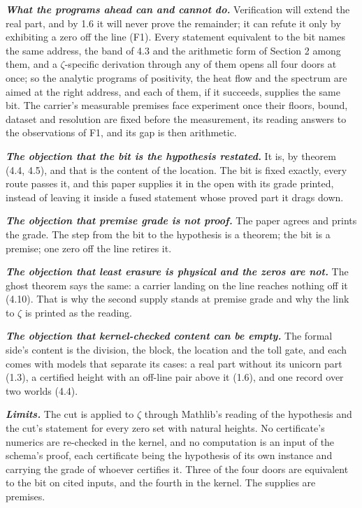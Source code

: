 \documentclass[10pt]{article}
\begin{document}
\textbf{\emph{What the programs ahead can and cannot do.}} Verification
will extend the real part, and by 1.6 it will never prove the remainder;
it can refute it only by exhibiting a zero off the line (F1). Every
statement equivalent to the bit names the same address, the band of 4.3
and the arithmetic form of Section 2 among them, and a
\(\zeta\)-specific derivation through any of them opens all four doors
at once; so the analytic programs of positivity, the heat flow and the
spectrum are aimed at the right address, and each of them, if it
succeeds, supplies the same bit. The carrier's measurable premises face
experiment once their floors, bound, dataset and resolution are fixed
before the measurement, its reading answers to the observations of F1,
and its gap is then arithmetic.

\textbf{\emph{The objection that the bit is the hypothesis restated.}}
It is, by theorem (4.4, 4.5), and that is the content of the location.
The bit is fixed exactly, every route passes it, and this paper supplies
it in the open with its grade printed, instead of leaving it inside a
fused statement whose proved part it drags down.

\textbf{\emph{The objection that premise grade is not proof.}} The paper
agrees and prints the grade. The step from the bit to the hypothesis is
a theorem; the bit is a premise; one zero off the line retires it.

\textbf{\emph{The objection that least erasure is physical and the zeros
are not.}} The ghost theorem says the same: a carrier landing on the
line reaches nothing off it (4.10). That is why the second supply stands
at premise grade and why the link to \(\zeta\) is printed as the
reading.

\textbf{\emph{The objection that kernel-checked content can be empty.}}
The formal side's content is the division, the block, the location and
the toll gate, and each comes with models that separate its cases: a
real part without its unicorn part (1.3), a certified height with an
off-line pair above it (1.6), and one record over two worlds (4.4).

\textbf{\emph{Limits.}} The cut is applied to \(\zeta\) through
Mathlib's reading of the hypothesis and the cut's statement for every
zero set with natural heights. No certificate's numerics are re-checked
in the kernel, and no computation is an input of the schema's proof,
each certificate being the hypothesis of its own instance and carrying
the grade of whoever certifies it. Three of the four doors are
equivalent to the bit on cited inputs, and the fourth in the kernel. The
supplies are premises.
\end{document}
